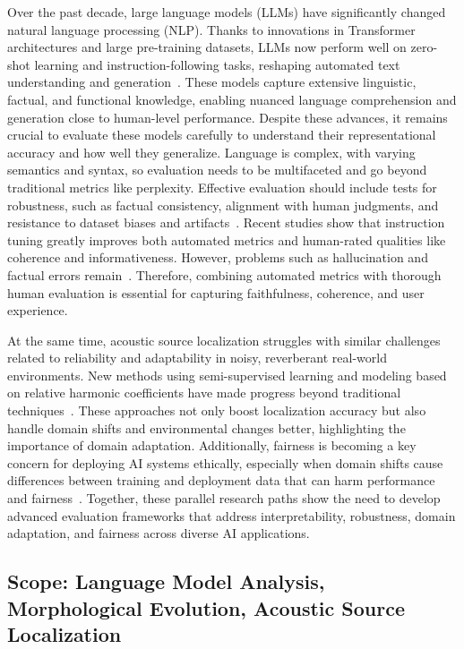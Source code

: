 \documentclass[sigconf]{acmart}
\begin{document}
Over the past decade, large language models (LLMs) have significantly changed natural language processing (NLP). Thanks to innovations in Transformer architectures and large pre-training datasets, LLMs now perform well on zero-shot learning and instruction-following tasks, reshaping automated text understanding and generation~\cite{ref10}. These models capture extensive linguistic, factual, and functional knowledge, enabling nuanced language comprehension and generation close to human-level performance. Despite these advances, it remains crucial to evaluate these models carefully to understand their representational accuracy and how well they generalize. Language is complex, with varying semantics and syntax, so evaluation needs to be multifaceted and go beyond traditional metrics like perplexity. Effective evaluation should include tests for robustness, such as factual consistency, alignment with human judgments, and resistance to dataset biases and artifacts~\cite{ref1,ref3}. Recent studies show that instruction tuning greatly improves both automated metrics and human-rated qualities like coherence and informativeness. However, problems such as hallucination and factual errors remain~\cite{ref1}. Therefore, combining automated metrics with thorough human evaluation is essential for capturing faithfulness, coherence, and user experience.

At the same time, acoustic source localization struggles with similar challenges related to reliability and adaptability in noisy, reverberant real-world environments. New methods using semi-supervised learning and modeling based on relative harmonic coefficients have made progress beyond traditional techniques~\cite{ref2,ref3,ref26}. These approaches not only boost localization accuracy but also handle domain shifts and environmental changes better, highlighting the importance of domain adaptation. Additionally, fairness is becoming a key concern for deploying AI systems ethically, especially when domain shifts cause differences between training and deployment data that can harm performance and fairness~\cite{ref26}. Together, these parallel research paths show the need to develop advanced evaluation frameworks that address interpretability, robustness, domain adaptation, and fairness across diverse AI applications.

\subsection{Scope: Language Model Analysis, Morphological Evolution, Acoustic Source Localization}
\end{document}
